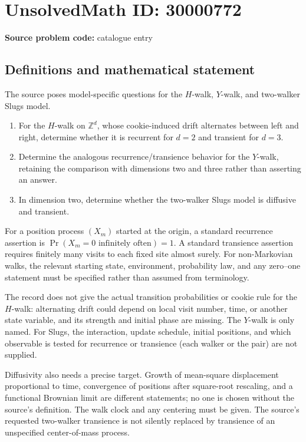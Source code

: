 \documentclass[11pt]{article}
\newcommand{\Z}{\mathbb{Z}}
\begin{document}
\section*{UnsolvedMath ID: 30000772}
\textbf{Source problem code:} catalogue entry
\subsection{Definitions and mathematical statement}
The source poses model-specific questions for the $H$-walk, $Y$-walk, and two-walker Slugs model.
\begin{enumerate}
\item For the $H$-walk on $\Z^d$, whose cookie-induced drift alternates between left and right, determine whether it is recurrent for $d=2$ and transient for $d=3$.
\item Determine the analogous recurrence/transience behavior for the $Y$-walk, retaining the comparison with dimensions two and three rather than asserting an answer.
\item In dimension two, determine whether the two-walker Slugs model is diffusive and transient.
\end{enumerate}

For a position process $(X_m)$ started at the origin, a standard recurrence assertion is $\Pr(X_m=0\text{ infinitely often})=1$. A standard transience assertion requires finitely many visits to each fixed site almost surely. For non-Markovian walks, the relevant starting state, environment, probability law, and any zero--one statement must be specified rather than assumed from terminology.

The record does not give the actual transition probabilities or cookie rule for the $H$-walk: alternating drift could depend on local visit number, time, or another state variable, and its strength and initial phase are missing. The $Y$-walk is only named. For Slugs, the interaction, update schedule, initial positions, and which observable is tested for recurrence or transience (each walker or the pair) are not supplied.

Diffusivity also needs a precise target. Growth of mean-square displacement proportional to time, convergence of positions after square-root rescaling, and a functional Brownian limit are different statements; no one is chosen without the source's definition. The walk clock and any centering must be given. The source's requested two-walker transience is not silently replaced by transience of an unspecified center-of-mass process.
\end{document}

